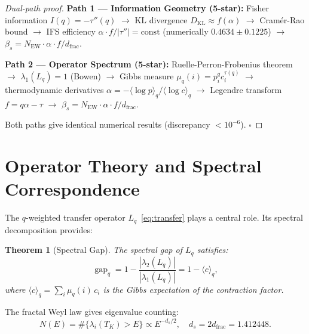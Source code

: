 \documentclass[12pt,a4paper]{article}
\newtheorem{theorem}{Theorem}[section]
\newcommand{\gap}{\operatorname{gap}}
\begin{document}
\begin{proof}[Dual-path proof]
\textbf{Path 1 --- Information Geometry (5-star):} 
Fisher information $I(q) = -\tau''(q)$ $\to$ KL divergence $D_{\text{KL}} \approx f(\alpha)$ 
$\to$ Cram\'er-Rao bound $\to$ IFS efficiency $\alpha \cdot f / |\tau''| = \text{const}$ 
(numerically $0.4634 \pm 0.1225$) $\to$ $\beta_s = N_{\text{EW}} \cdot \alpha \cdot f / d_{\text{frac}}$.

\textbf{Path 2 --- Operator Spectrum (5-star):} 
Ruelle-Perron-Frobenius theorem $\to$ $\lambda_1(L_q) = 1$ (Bowen) $\to$ 
Gibbs measure $\mu_q(i) = p_i^q c_i^{\tau(q)}$ $\to$ thermodynamic derivatives 
$\alpha = -\langle \log p \rangle_q / \langle \log c \rangle_q$ $\to$ 
Legendre transform $f = q\alpha - \tau$ $\to$ $\beta_s = N_{\text{EW}} \cdot \alpha \cdot f / d_{\text{frac}}$.

Both paths give identical numerical results (discrepancy $< 10^{-6}$). $\square$
\end{proof}

\section{Operator Theory and Spectral Correspondence}
\label{sec:operator}

The $q$-weighted transfer operator $L_q$~\eqref{eq:transfer} plays a central role.
Its spectral decomposition provides:

\begin{theorem}[Spectral Gap]
The spectral gap of $L_q$ satisfies:
\begin{equation}
\gap_q = 1 - \frac{|\lambda_2(L_q)|}{|\lambda_1(L_q)|} = 1 - \langle c \rangle_q,
\end{equation}
where $\langle c \rangle_q = \sum_i \mu_q(i) \, c_i$ is the Gibbs expectation 
of the contraction factor.
\end{theorem}

The fractal Weyl law gives eigenvalue counting:
\begin{equation}
N(E) = \#\{\lambda_i(T_K) > E\} \propto E^{-d_s/2},\quad d_s = 2d_{\text{frac}} = 1.412448.
\end{equation}

\end{document}
